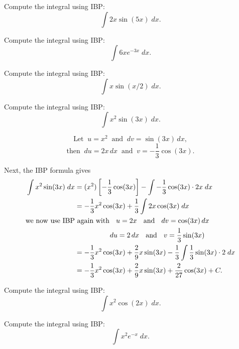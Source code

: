 \documentclass{ximera}
\begin{document}
\begin{problem}
Compute the integral using IBP:
  \[
  \int 2x\sin(5x)\;dx.
  \]

\end{problem}


\begin{problem}
Compute the integral using IBP:
  \[
  \int 6xe^{-3x} \;dx.
  \]

\end{problem}


\begin{problem}
Compute the integral using IBP:
  \[
  \int x\sin(x/2) \;dx.
  \]

\end{problem}


\begin{example}
Compute the integral using IBP:
  \[
  \int x^2\sin(3x) \;dx.
  \]

\[
\text{Let} \;\; u = x^2 \;\; \text{and} \;\; dv = \sin(3x) \,dx,
\]
\[
\text{then} \;\; du = 2x \,dx \;\; \text{and} \;\; v = -\frac13 \cos(3x).
\]

Next, the IBP formula gives
\begin{align*}
\int x^2\sin(3x) \;dx &= (x^2)\left[-\frac13 \cos(3x)\right] - \int -\frac13 \cos(3x) \cdot 2x \; dx \\
                       &= -\frac13 x^2\cos(3x) + \frac13 \int 2x\cos(3x) \; dx\\                               
\text{we now use IBP} & \text{ again with \; $u = 2x$ \; and \; $dv = \cos(3x) \, dx$}\\
& \qquad \qquad \quad \text{$du = 2 \, dx$ \; and \; $v=\frac13 \sin(3x)$}\\
                       &= -\frac13 x^2\cos(3x) + \frac29x\sin(3x) - \frac13 \int \frac13 \sin(3x)\cdot 2 \; dx\\
                       &= -\frac13 x^2\cos(3x) + \frac29x\sin(3x) + \frac{2}{27} \cos(3x) + C.
\end{align*}

\end{example}


\begin{problem}
Compute the integral using IBP:
  \[
  \int x^2\cos(2x) \;dx.
  \]

\end{problem}

\begin{problem}
Compute the integral using IBP:
  \[
  \int x^2e^{-x} \;dx.
  \]

\end{problem}
\end{document}
